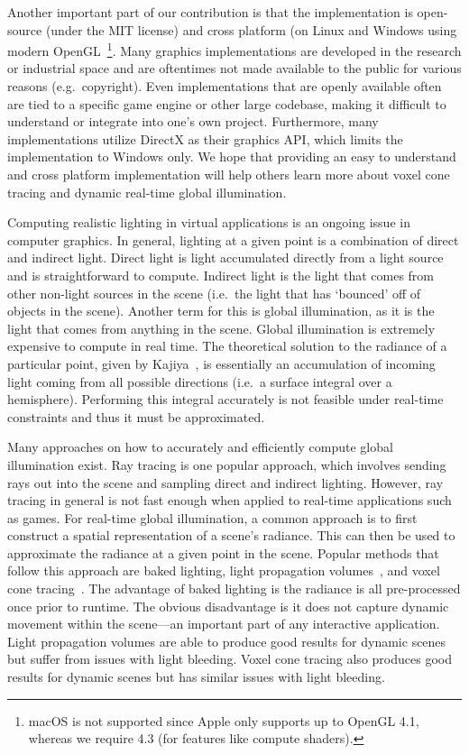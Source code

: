 Another important part of our contribution is that the implementation is open-source (under the MIT license) and cross platform (on Linux and Windows using modern OpenGL~\footnote{macOS is not supported since Apple only supports up to OpenGL 4.1, whereas we require 4.3 (for features like compute shaders).}. Many graphics implementations are developed in the research or industrial space and are oftentimes not made available to the public for various reasons (e.g.\ copyright). Even implementations that are openly available often are tied to a specific game engine or other large codebase, making it difficult to understand or integrate into one's own project. Furthermore, many implementations utilize DirectX as their graphics API, which limits the implementation to Windows only. We hope that providing an easy to understand and cross platform implementation will help others learn more about voxel cone tracing and dynamic real-time global illumination.

\iffalse
Computing realistic lighting in virtual applications is an ongoing issue in computer graphics. In general, lighting at a given point is a combination of direct and indirect light. Direct light is light accumulated directly from a light source and is straightforward to compute. Indirect light is the light that comes from other non-light sources in the scene (i.e.\ the light that has `bounced' off of objects in the scene). Another term for this is global illumination, as it is the light that comes from anything in the scene. Global illumination is extremely expensive to compute in real time. The theoretical solution to the radiance of a particular point, given by Kajiya~\cite{kajiya1986rendering}, is essentially an accumulation of incoming light coming from all possible directions (i.e.\ a surface integral over a hemisphere). Performing this integral accurately is not feasible under real-time constraints and thus it must be approximated.

Many approaches on how to accurately and efficiently compute global illumination exist. Ray tracing is one popular approach, which involves sending rays out into the scene and sampling direct and indirect lighting. However, ray tracing in general is not fast enough when applied to real-time applications such as games. For real-time global illumination, a common approach is to first construct a spatial representation of a scene's radiance. This can then be used to approximate the radiance at a given point in the scene. Popular methods that follow this approach are baked lighting, light propagation volumes~\cite{kaplanyan2010cascaded}, and voxel cone tracing~\cite{crassin2011interactive}. The advantage of baked lighting is the radiance is all pre-processed once prior to runtime. The obvious disadvantage is it does not capture dynamic movement within the scene---an important part of any interactive application. Light propagation volumes are able to produce good results for dynamic scenes but suffer from issues with light bleeding. Voxel cone tracing also produces good results for dynamic scenes but has similar issues with light bleeding.

